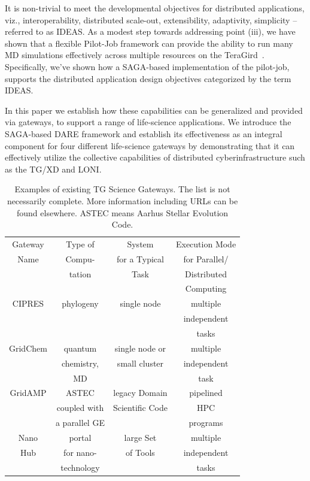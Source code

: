 \documentclass{sig-alternate}
\begin{document}
It is non-trivial to meet the developmental objectives for distributed
applications, viz., interoperability, distributed scale-out,
extensibility, adaptivity, simplicity -- referred to as
IDEAS\cite{ideas}.  As a modest step towards addressing point (iii),
we have shown that a flexible Pilot-Job framework can provide the
ability to run many MD simulations effectively across multiple
resources on the TeraGird~\cite{saga-royalsoc, saga-ccgrid10}.
Specifically, we've shown how a SAGA-based implementation of the
pilot-job, supports the distributed application design objectives
categorized by the term IDEAS\cite{ideas}.


In this paper we establish how these capabilities can be generalized
and provided via gateways, to support a range of life-science
applications.  We introduce the SAGA-based DARE framework and
establish its effectiveness as an integral component for four
different life-science gateways by demonstrating that it can
effectively utilize the collective capabilities of distributed
cyberinfrastructure such as the TG/XD and LONI.

\begin{table}
 \small
\begin{tabular}{|c|c|c|c|} 
  \hline Gateway  & Type of & System  & Execution Mode 
  \\
  Name & Compu- & for a Typical & for Parallel/ \\ 
  &  tation & Task & Distributed \\
  & & & Computing \\  \hline \hline 
  
  CIPRES   & phylogeny  &  single node  & multiple  \\
   &  &   & independent   \\ 
  &  &  &  tasks \\  \hline
  GridChem   & quantum & single node or     & multiple  \\
     & chemistry, & small cluster & independent   \\
  & MD &  & task  \\ \hline
   GridAMP     & ASTEC  & legacy Domain  & pipelined \\ 
  & coupled with  &  Scientific Code   & HPC  \\
  & a parallel GE &   &  programs \\ \hline
  Nano  & portal  & large Set   & multiple \\
  Hub  & for nano- & of Tools  & independent \\
   & technology &  & tasks \\ \hline
  \hline
\end{tabular} \caption{Examples of existing TG Science Gateways. The list is not necessarily complete. More information including URLs can be found elsewhere\cite{tg-sg-list-url}.  ASTEC means Aarhus Stellar Evolution Code.}
 \label{table:TG-sg} 
\end{table}
\end{document}

